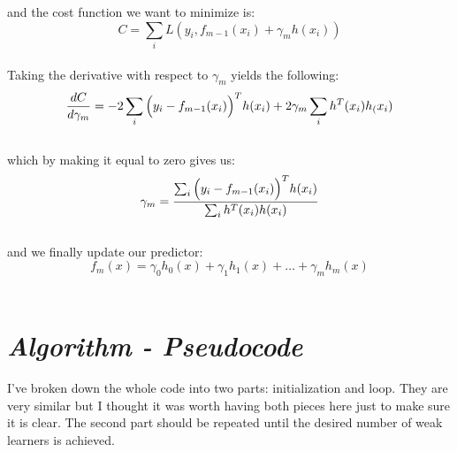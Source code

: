 \noindent and the cost function we want to minimize is:\\

\begin{equation*}
C=\sum_{i}L(y_i,f_{m-1}(x_i)+\gamma_mh(x_i))
\end{equation*}\\

Taking the derivative with respect to $\gamma_m$ yields the following:\\

\begin{equation*}
\frac{dC}{d\gamma_m}=-2\sum_{i}\Big(y_i-f_{m-1}(x_i)\Big)^Th(x_i)+2\gamma_m\sum_{i}h^T(x_i)h_(x_i)
\end{equation*}\\

\noindent which by making it equal to zero gives us:\\

\begin{equation*}
\gamma_m=\frac{\sum_{i}\Big(y_i-f_{m-1}(x_i)\Big)^Th(x_i)}{\sum_{i}h^T(x_i)h(x_i)}
\end{equation*}\\

\noindent and we finally update our predictor:\\

\begin{equation*}
f_m(x)=\gamma_0h_0(x)+\gamma_1h_1(x)+\dots+\gamma_mh_m(x)
\end{equation*}\\


\section*{\emph{\textbf{Algorithm - Pseudocode}}}

\makeatletter
\def\BState{\State\hskip-\ALG@thistlm}
\makeatother

I've broken down the whole code into two parts: initialization and loop. They are very similar but I thought it was worth having both pieces here just to make sure it is clear. The second part should be repeated until the desired number of weak learners is achieved.\\

